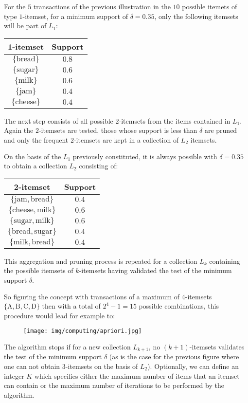 	For the $5$ transactions of the previous illustration in the $10$ possible itemets of type $1$-itemset, for a minimum support of $\delta= 0.35$, only the following itemsets will be part of $L_1$:
	\begin{table}[H]
		\centering
		\begin{tabular}{|c|c|}
		\hline
		\rowcolor[HTML]{9B9B9B} 
		\textbf{$\pmb{1}$-itemset} & \textbf{Support} \\ \hline
		$\{\mathrm{bread}\}$ & $0.8$ \\ \hline
		$\{\mathrm{sugar}\}$ & $0.6$ \\ \hline
		$\{\mathrm{milk}\}$ & $0.6$ \\ \hline
		$\{\mathrm{jam}\}$ & $0.4$ \\ \hline
		$\{\mathrm{cheese}\}$ & $0.4$ \\ \hline
		\end{tabular}
	\end{table}
	The next step consists of all possible $2$-itemsets from the items contained in $L_1$. Again the $2$-itemsets are tested, those whose support is less than $\delta$ are pruned and only the frequent $2$-itemsets are kept in a collection of $L_2$ itemsets.
	
	On the basis of the $L_1$ previously constituted, it is always possible with $\delta = 0.35$ to obtain a collection $L_2$ consisting of:
	\begin{table}[H]
		\centering
		\begin{tabular}{|c|c|}
		\hline
		\rowcolor[HTML]{9B9B9B} 
		\textbf{$\pmb{2}$-itemset} & \textbf{Support} \\ \hline
		$\{\mathrm{jam},\mathrm{bread}\}$ & $0.4$ \\ \hline
		$\{\mathrm{cheese},\mathrm{milk}\}$ & $0.6$ \\ \hline
		$\{\mathrm{sugar},\mathrm{milk}\}$ & $0.6$ \\ \hline
		$\{\mathrm{bread},\mathrm{sugar}\}$ & $0.4$ \\ \hline
		$\{\mathrm{milk},\mathrm{bread}\}$ & $0.4$ \\ \hline
		\end{tabular}
	\end{table}
	This aggregation and pruning process is repeated for a collection $L_k$ containing the possible itemsets of $k$-itemsets having validated the test of the minimum support $\delta$.
	
	So figuring the concept with transactions of a maximum of $4$-itemsets $\{\mathrm{A},\mathrm{B},\mathrm{C},\mathrm{D}\}$ then with a total of $2^4-1=15$ possible combinations, this procedure would lead for example to:
	\begin{figure}[H]
		\centering
		\texttt{[image: img/computing/apriori.jpg]}
	\end{figure}
	The algorithm stops if for a new collection $L_{k+1}$, no $(k + 1)$-itemsets validates the test of the minimum support $\delta$ (as is the case for the previous figure where one can not obtain $3$-itemsets on the basis of $L_2$). Optionally, we can define an integer $K$ which specifies either the maximum number of items that an itemset can contain or the maximum number of iterations to be performed by the algorithm.
	
